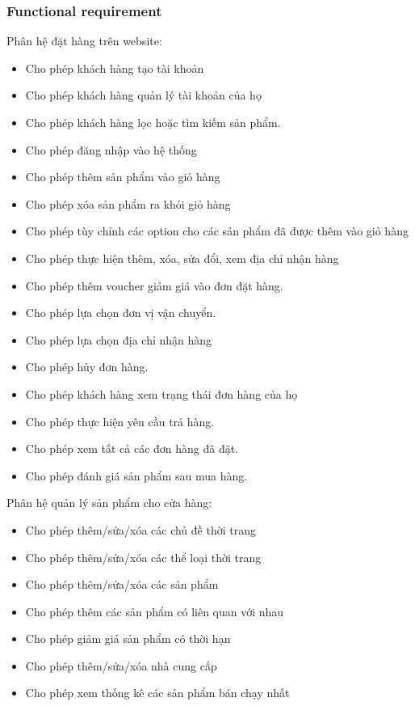 \documentclass[12pt,a4paper,2sides]{report}
\begin{document}
\subsubsection{Functional requirement}
Phân hệ đặt hàng trên website:
\begin{itemize}
    \item Cho phép khách hàng tạo tài khoản
    \item Cho phép khách hàng quản lý tài khoản của họ
    \item Cho phép khách hàng lọc hoặc tìm kiếm sản phẩm.
    \item Cho phép đăng nhập vào hệ thống
    \item Cho phép thêm sản phẩm vào giỏ hàng
    \item Cho phép xóa sản phẩm ra khỏi giỏ hàng
    \item Cho phép tùy chỉnh các option cho các sản phẩm đã được thêm vào giỏ hàng
    \item Cho phép thực hiện thêm, xóa, sửa đổi, xem địa chỉ nhận hàng
    \item Cho phép thêm voucher giảm giá vào đơn đặt hàng.
    \item Cho phép lựa chọn đơn vị vận chuyển.
    \item Cho phép lựa chọn địa chỉ nhận hàng
    \item Cho phép hủy đơn hàng.
    \item Cho phép khách hàng xem trạng thái đơn hàng của họ
    \item Cho phép thực hiện yêu cầu trả hàng.
    \item Cho phép xem tất cả các đơn hàng đã đặt.
    \item Cho phép đánh giá sản phẩm sau mua hàng.
\end{itemize}
Phân hệ quản lý sản phẩm cho cửa hàng:
\begin{itemize}
    \item Cho phép thêm/sửa/xóa các chủ đề thời trang
    \item Cho phép thêm/sửa/xóa các thể loại thời trang
    \item Cho phép thêm/sửa/xóa các sản phẩm
    \item Cho phép thêm các sản phẩm có liên quan với nhau
    \item Cho phép giảm giá sản phẩm có thời hạn
    \item Cho phép thêm/sửa/xóa nhà cung cấp
    \item Cho phép xem thống kê các sản phẩm bán chạy nhất
\end{itemize}
\end{document}
